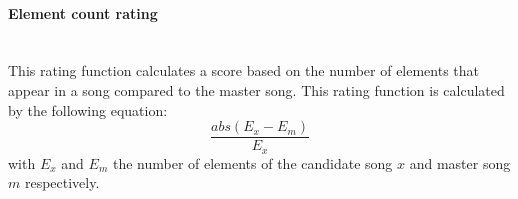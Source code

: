 \paragraph{Element count rating}\mbox{}\\
This rating function calculates a score based on the number of elements that appear in a song compared to the master song. This rating function is calculated by the following equation:
\[\frac{abs( E_{x}-E_{m}) }{E_{x}} \]
with $E_{x}$ and $E_{m}$ the number of elements of the candidate song $x$ and master song $m$ respectively.
